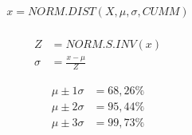 
{\begin{align*}
    x = NORM.DIST(X, \mu, \sigma, CUMM) \\
\end{align*}}


{\begin{align*}
    Z &= NORM.S.INV(x) \\
    \sigma &= \displaystyle\frac{x-\mu}{Z} 
\end{align*}}


{\begin{align*}
    \mu \pm 1\sigma &= 68,26\%  \\
    \mu \pm 2\sigma &= 95,44\% \\
    \mu \pm 3\sigma &= 99,73\% \\
\end{align*}}
